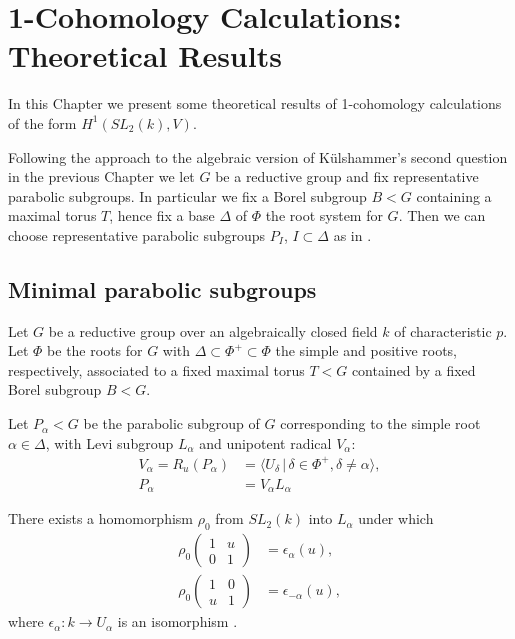 
\chapter{1-Cohomology Calculations: Theoretical Results}
\label{Chapter5}

In this Chapter we present some theoretical results of 1-cohomology calculations of the form $H^1(SL_2(k), V)$. 

Following the approach to the algebraic version of K\"ulshammer's second question in the previous Chapter we let $G$ be a reductive group and fix representative parabolic subgroups. In particular we fix a Borel subgroup $B<G$ containing a maximal torus $T$, hence fix a base $\Delta$ of $\Phi$ the root system for $G$. Then we can choose representative parabolic subgroups $P_I$, $I \subset \Delta$ as in \cite[\S 30]{humphreys1975linear}.

\section{Minimal parabolic subgroups}

Let $G$ be a reductive group over an algebraically closed field $k$ of characteristic $p$. Let $\Phi$ be the roots for $G$ with $\Delta \subset \Phi^+ \subset \Phi$ the simple and positive roots, respectively, associated to a fixed maximal torus $T < G$ contained by a fixed Borel subgroup $B < G$.

Let $P_\alpha<G$ be the parabolic subgroup of $G$ corresponding to the simple root $\alpha\in\Delta$, with Levi subgroup $L_\alpha$ and unipotent radical $V_\alpha$:
\begin{align*}
V_\alpha=R_u(P_\alpha) &= \langle U_\delta \,|\, \delta \in \Phi^+, \delta \neq \alpha \rangle,\\
P_\alpha &= V_\alpha L_\alpha 
\end{align*}

There exists a homomorphism $\rho_0$ from $ SL_2(k)$ into $L_\alpha$ under which
\begin{align*}
\rho_0 \left(\begin{matrix} 1 &  u \\ 0 & 1 \end{matrix} \right) &= \epsilon_\alpha(u), \\
\rho_0 \left(\begin{matrix} 1 & 0 \\ u & 1 \end{matrix} \right) &= \epsilon_{-\alpha}(u),
\end{align*}
where $\epsilon_\alpha : k \rightarrow U_\alpha$ is an isomorphism \cite[Theorem 26.3(c)]{humphreys1975linear}.

